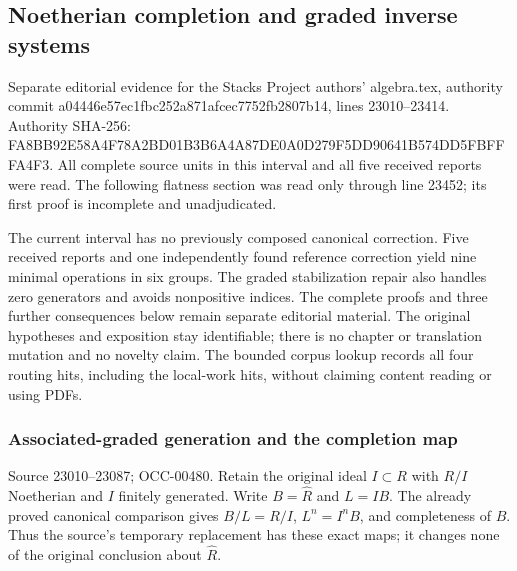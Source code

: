 \subsection{Noetherian completion and graded inverse systems}\label{algebra-proof-015-noetherian-completion-and-graded-inverse-systems}

Separate editorial evidence for the Stacks Project authors' algebra.tex, authority commit a044\allowbreak{}46e5\allowbreak{}7ec1\allowbreak{}fbc2\allowbreak{}52a8\allowbreak{}71af\allowbreak{}cec7\allowbreak{}752f\allowbreak{}b280\allowbreak{}7b14, lines 23010--23414. Authority SHA-256: FA8B\allowbreak{}B92E\allowbreak{}58A4\allowbreak{}F78A\allowbreak{}2BD0\allowbreak{}1B3B\allowbreak{}6A4A\allowbreak{}87DE\allowbreak{}0A0D\allowbreak{}279F\allowbreak{}5DD9\allowbreak{}0641\allowbreak{}B574\allowbreak{}DD5F\allowbreak{}BFFF\allowbreak{}A4F3. All complete source units in this interval and all five received reports were read. The following flatness section was read only through line 23452; its first proof is incomplete and unadjudicated.

The current interval has no previously composed canonical correction. Five received reports and one independently found reference correction yield nine minimal operations in six groups. The graded stabilization repair also handles zero generators and avoids nonpositive indices. The complete proofs and three further consequences below remain separate editorial material. The original hypotheses and exposition stay identifiable; there is no chapter or translation mutation and no novelty claim. The bounded corpus lookup records all four routing hits, including the local-work hits, without claiming content reading or using PDFs.

\subsubsection{Associated-graded generation and the completion map}\label{algebra-proof-015-associated-graded-generation-and-the-completion-map}

Source 23010--23087; OCC-00480. Retain the original ideal \(I\subset R\) with \(R/I\) Noetherian and \(I\) finitely generated. Write \(B=\widehat R\) and \(L=IB\). The already proved canonical comparison gives \(B/L=R/I\), \(L^n=I^nB\), and completeness of \(B\). Thus the source's temporary replacement has these exact maps; it changes none of the original conclusion about \(\widehat R\).

